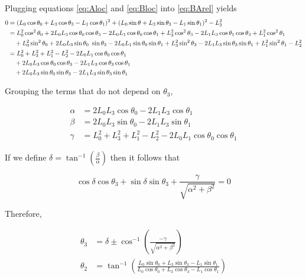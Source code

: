 \documentclass[letterpaper]{article}
\begin{document}
\noindent Plugging equations \ref{eq:Aloc} and \ref{eq:Bloc} into \ref{eq:BArel} yields
\begin{align}
	0 &= (L_0 \cos \theta_0 + L_3 \cos \theta_3 - L_1 \cos \theta_1)^2 + (L_0 \sin \theta + L_3 \sin \theta_3 - L_1 \sin \theta_1)^2 - L_2^2 \notag \\
	  &= L_0^2 \cos^2 \theta_0 + 2 L_0 L_3 \cos \theta_0 \cos \theta_3 - 2 L_0 L_1 \cos \theta_0 \cos \theta_1 + L_3^2 \cos^2 \theta_3 - 2 L_1 L_3 \cos \theta_1 \cos \theta_3 + L_1^2 \cos^2 \theta_1 \notag \\
	  & \quad  + L_0^2 \sin^2 \theta_0 + 2 L_0 L_3 \sin \theta_0\ \sin \theta_3 -2 L_0 L_1 \sin \theta_0 \sin \theta_1 + L_3^2 \sin^2 \theta_3 - 2 L_1 L_3 \sin \theta_3 \sin \theta_1 + L_1^2 \sin^2 \theta_1 - L_2^2 \notag \\
	  &= L_0^2 + L_3^2 + L_1^2 - L_2^2 - 2 L_0 L_1 \cos \theta_0 \cos \theta_1 \notag \\
	  &  \quad + 2 L_0 L_3 \cos \theta_0 \cos \theta_3 - 2 L_1 L_3 \cos \theta_3 \cos \theta_1 \notag \\
	  &  \quad + 2 L_0 L_3 \sin \theta_0 \sin \theta_3 - 2 L_1 L_3 \sin \theta_3 \sin \theta_1
\end{align}

\noindent Grouping the terms that do not depend on $\theta_3$,

\begin{align}
	\alpha &= 2 L_0 L_3 \cos \theta_0 - 2 L_1 L_3 \cos \theta_1 \\
	\beta &=  2 L_0 L_3 \sin \theta_0 - 2 L_1 L_3 \sin \theta_1 \\
	\gamma &= L_0^2 + L_3^2 + L_1^2 - L_2^2 - 2 L_0 L_1 \cos \theta_0 \cos \theta_1
\end{align}

\noindent If we define $\delta = \tan^{-1} \left( \frac{\beta}{\alpha} \right)$ then it follows that

\begin{equation}
	\cos \delta \cos \theta_3 + \sin \delta \sin \theta_3 + \frac{\gamma}{\sqrt{\alpha^2 + \beta^2}} = 0
\end{equation}

\noindent Therefore, 

\begin{align}
	\theta_3 &= \delta \pm \cos^{-1} \left( \frac{- \gamma}{\sqrt{\alpha^2 + \beta^2}} \right) \\
	\theta_2 &= \tan^{-1} \left( \frac{ L_0 \sin \theta_0 + L_3 \sin \theta_3 - L_1 \sin \theta_1}{L_0 \cos \theta_0 + L_3 \cos \theta_3 - L_1 \cos \theta_1} \right)
\end{align}
\end{document}
